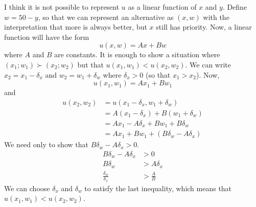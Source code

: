 \begin{enumerate}
\begin{solution}
  \bs I think it is not possible to represent $u$ as a linear
  function of $x$ and $y$. Define $w=50-y$, so that we can represent
  an alternative as $(x,w)$ with the interpretation that more is always
  better, but $x$ still has priority. Now, a linear function will have
  the form
  \[
  u(x,w) = Ax + Bw
  \]
  where $A$ and $B$ are constants.
  It is enough to show a situation where $(x_1;w_1) \succ (x_2;w_2)$
  but that $u(x_1,w_1) < u(x_2,w_2)$. We can write $x_2=x_1-\delta_x$
  and $w_2=w_1+\delta_w$ where $\delta_x > 0$ (so that $x_1>x_2$).
  Now,
  \[
  u(x_1,w_1) = Ax_1 + Bw_1
  \]
  and
  \begin{align*}
    u(x_2,w_2) &= u(x_1-\delta_x,w_1+\delta_w) \\
    &= A(x_1-\delta_x) + B(w_1 + \delta_w) \\
    &= Ax_1 - A\delta_x + Bw_1 + B\delta_w \\
    &= Ax_1 + Bw_1 + (B\delta_w - A\delta_x)
  \end{align*}
  We need only to show that $B\delta_w-A\delta_x > 0$.
  \begin{align*}
    B\delta_w - A\delta_x &> 0 \\
    B\delta_w &> A\delta_x \\
    \frac{\delta_w}{\delta_x} &> \frac{A}{B}
  \end{align*}
  We can choose $\delta_x$ and $\delta_w$ to satisfy the last
  inequality, which means that $u(x_1,w_1) < u(x_2,w_2)$.
\end{solution}

\end{enumerate}
